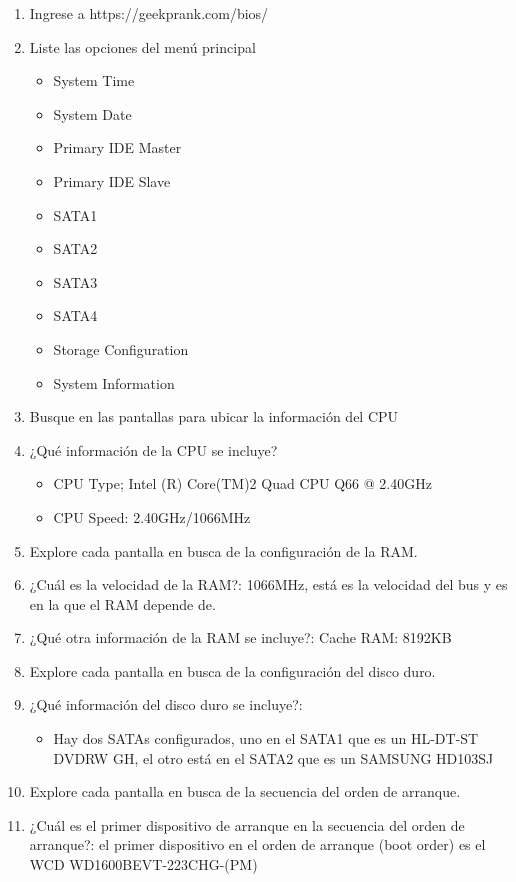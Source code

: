 \documentclass[stu, 12pt, letterpaper, donotrepeattitle, floatsintext, natbib, helv]{apa7}
\begin{document}
\begin{enumerate}
    \item Ingrese a https://geekprank.com/bios/
    \item Liste las opciones del menú principal
    \begin{itemize}
        \item System Time
        \item System Date
        \item Primary IDE Master
        \item Primary IDE Slave
        \item SATA1
        \item SATA2
        \item SATA3
        \item SATA4
        \item Storage Configuration
        \item System Information
    \end{itemize}
    \item Busque en las pantallas para ubicar la información del CPU
    \item ¿Qué información de la CPU se incluye?
    \begin{itemize}
        \item CPU Type; Intel (R) Core(TM)2 Quad CPU Q66 @ 2.40GHz
        \item CPU Speed: 2.40GHz/1066MHz
    \end{itemize}
    \item Explore cada pantalla en busca de la configuración de la RAM.
    \item ¿Cuál es la velocidad de la RAM?: 1066MHz, está es la velocidad del bus y es en la que el RAM depende de.
    \item ¿Qué otra información de la RAM se incluye?: Cache RAM: 8192KB
    \item Explore cada pantalla en busca de la configuración del disco duro.
    \item ¿Qué información del disco duro se incluye?:
    \begin{itemize}
        \item Hay dos SATAs configurados, uno en el SATA1 que es un HL-DT-ST DVDRW GH, el otro está en el SATA2 que es un SAMSUNG HD103SJ
    \end{itemize}
    \item Explore cada pantalla en busca de la secuencia del orden de arranque.
    \item ¿Cuál es el primer dispositivo de arranque en la secuencia del orden de arranque?: el primer dispositivo en el orden de arranque (boot order) es el WCD WD1600BEVT-223CHG-(PM)

\end{enumerate}
\end{document}
